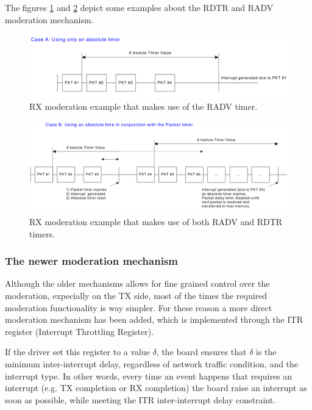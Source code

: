 The figures \ref{fig:radvonly} and \ref{fig:rdtrradv} depict some examples about the RDTR and RADV moderation mechanism.

\begin{figure}[bt]
\centering
\includegraphics[scale = 0.45]{radv-only.png}
\caption{RX moderation example that makes use of the RADV timer.}
\label{fig:radvonly}
\end{figure}

\begin{figure}[bt]
\centering
\includegraphics[scale = 0.45]{rdtr-radv.png}
\caption{RX moderation example that makes use of both RADV and RDTR timers.}
\label{fig:rdtrradv}
\end{figure}


\subsubsection{The newer moderation mechanism}
\label{sec:itrmit}
Although the older mechanisms allows for fine grained control over the moderation, expecially on the TX side, most of the times the 
required moderation functionality is way simpler. For these reason a more direct moderation mechanism has been added, which is implemented
through the ITR register (Interrupt Throttling Register).

If the driver set this register to a value $\delta$, the board ensures that $\delta$ is the minimum inter-interrupt delay, regardless of
network traffic condition, and the interrupt type.
In other words, every time an event happens that requires an interrupt (e.g. TX completion or RX completion) the board raise an interrupt
as soon as possible, while meeting the ITR inter-interrupt delay constraint.

